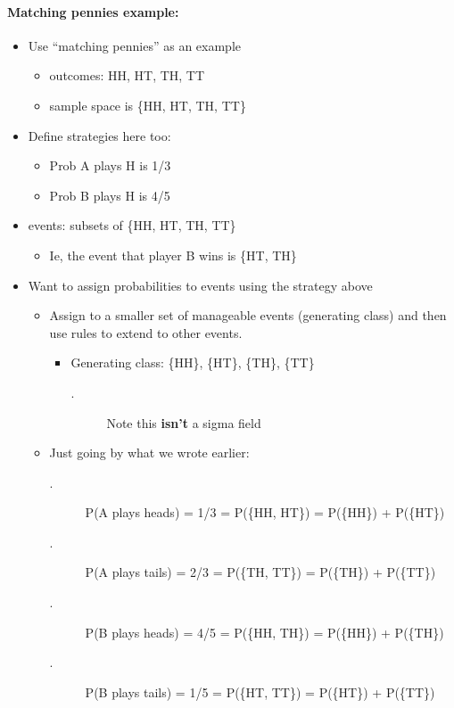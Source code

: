 \paragraph{Matching pennies example:}

\begin{itemize}
\item Use ``matching pennies'' as an example
\begin{itemize}
\item outcomes: HH, HT, TH, TT
\item sample space is \{HH, HT, TH, TT\}
\end{itemize}
\item Define strategies here too:
\begin{itemize}
\item Prob A plays H is 1/3
\item Prob B plays H is 4/5
\end{itemize}
\item events: subsets of \{HH, HT, TH, TT\}
\begin{itemize}
\item Ie, the event that player B wins is \{HT, TH\}
\end{itemize}
\item Want to assign probabilities to events using the strategy above
\begin{itemize}
\item Assign to a smaller set of manageable events (generating
          class) and then use rules to extend to other events.
\begin{itemize}
\item Generating class: \{{HH\}, \{HT\}, \{TH\}, \{TT\}}
\begin{description}
\item[.] Note this \textbf{isn't} a sigma field
\end{description}
\end{itemize}
\item Just going by what we wrote earlier:
\begin{description}
\item[.] P(A plays heads) = 1/3 = P(\{HH, HT\}) = P(\{HH\}) + P(\{HT\})
\item[.] P(A plays tails) = 2/3 = P(\{TH, TT\}) = P(\{TH\}) + P(\{TT\})
\item[.] P(B plays heads) = 4/5 = P(\{HH, TH\}) = P(\{HH\}) + P(\{TH\})
\item[.] P(B plays tails) = 1/5 = P(\{HT, TT\}) = P(\{HT\}) + P(\{TT\})
\end{description}

\end{itemize}
\end{itemize}
